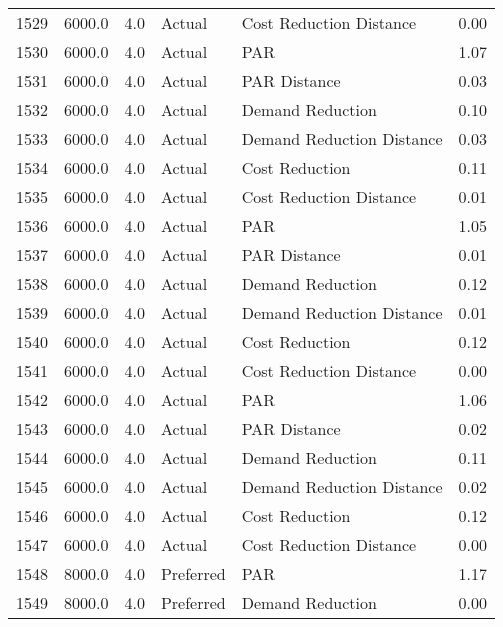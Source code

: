\begin{longtable}{lrrllr}
1529 &       6000.0 &     4.0 &         Actual &    Cost Reduction Distance &   0.00 \\
1530 &       6000.0 &     4.0 &         Actual &                        PAR &   1.07 \\
1531 &       6000.0 &     4.0 &         Actual &               PAR Distance &   0.03 \\
1532 &       6000.0 &     4.0 &         Actual &           Demand Reduction &   0.10 \\
1533 &       6000.0 &     4.0 &         Actual &  Demand Reduction Distance &   0.03 \\
1534 &       6000.0 &     4.0 &         Actual &             Cost Reduction &   0.11 \\
1535 &       6000.0 &     4.0 &         Actual &    Cost Reduction Distance &   0.01 \\
1536 &       6000.0 &     4.0 &         Actual &                        PAR &   1.05 \\
1537 &       6000.0 &     4.0 &         Actual &               PAR Distance &   0.01 \\
1538 &       6000.0 &     4.0 &         Actual &           Demand Reduction &   0.12 \\
1539 &       6000.0 &     4.0 &         Actual &  Demand Reduction Distance &   0.01 \\
1540 &       6000.0 &     4.0 &         Actual &             Cost Reduction &   0.12 \\
1541 &       6000.0 &     4.0 &         Actual &    Cost Reduction Distance &   0.00 \\
1542 &       6000.0 &     4.0 &         Actual &                        PAR &   1.06 \\
1543 &       6000.0 &     4.0 &         Actual &               PAR Distance &   0.02 \\
1544 &       6000.0 &     4.0 &         Actual &           Demand Reduction &   0.11 \\
1545 &       6000.0 &     4.0 &         Actual &  Demand Reduction Distance &   0.02 \\
1546 &       6000.0 &     4.0 &         Actual &             Cost Reduction &   0.12 \\
1547 &       6000.0 &     4.0 &         Actual &    Cost Reduction Distance &   0.00 \\
1548 &       8000.0 &     4.0 &      Preferred &                        PAR &   1.17 \\
1549 &       8000.0 &     4.0 &      Preferred &           Demand Reduction &   0.00 \\

\end{longtable}

